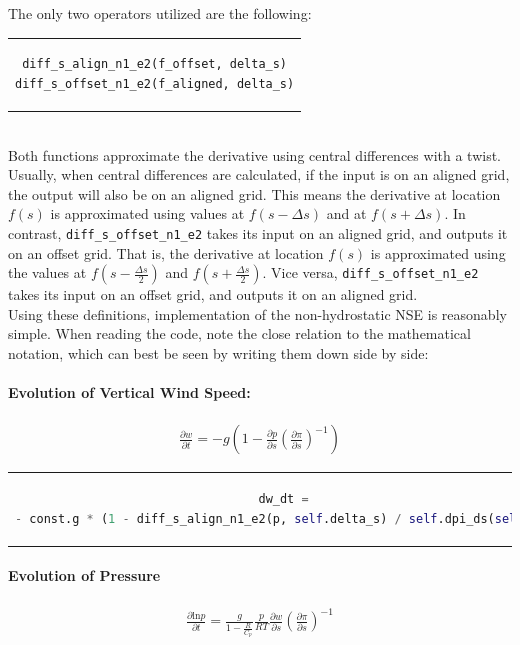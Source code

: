 The only two operators utilized are the following:\\
\begin{tabular}{c}
\begin{lstlisting}[language=Python]
diff_s_align_n1_e2(f_offset, delta_s)
diff_s_offset_n1_e2(f_aligned, delta_s)
\end{lstlisting}
\end{tabular}\\
Both functions approximate the derivative using central differences with a twist.
Usually, when central differences are calculated, if the input is on an aligned grid, the output will also be on an aligned grid.
This means the derivative at location $f(s)$ is approximated using values at $f(s-\Delta s)$ and at $f(s+\Delta s)$.
In contrast, \texttt{diff\_s\_offset\_n1\_e2} takes its input on an aligned grid, and outputs it on an offset grid.
That is, the derivative at location $f(s)$ is approximated using the values at $f(s-\frac{\Delta s}{2})$ and $f(s+\frac{\Delta s}{2})$.
Vice versa, \texttt{diff\_s\_offset\_n1\_e2} takes its input on an offset grid, and outputs it on an aligned grid.\\
Using these definitions, implementation of the non-hydrostatic NSE is reasonably simple.
When reading the code, note the close relation to the mathematical notation, which can best be seen by writing them down side by side:
\paragraph{Evolution of Vertical Wind Speed:}
\begin{align*}
\frac{\partial w}{\partial t} = -g\left(1 - \frac{\partial p}{\partial s}\left(\frac{\partial \pi}{\partial s}\right)^{-1}\right)
\end{align*}
\begin{center}
\begin{tabular}{c}
\begin{lstlisting}[language=Python]
dw_dt =
- const.g * (1 - diff_s_align_n1_e2(p, self.delta_s) / self.dpi_ds(self.s))
\end{lstlisting}
\end{tabular}
\end{center}

\paragraph{Evolution of Pressure}
\begin{align*}
\frac{\partial \text{ln}p}{\partial t} = \frac{g}{1- \frac{R}{C_p}} \frac{p}{RT} \frac{\partial w}{\partial s}\left(\frac{\partial \pi}{\partial s}\right)^{-1}
\end{align*}

